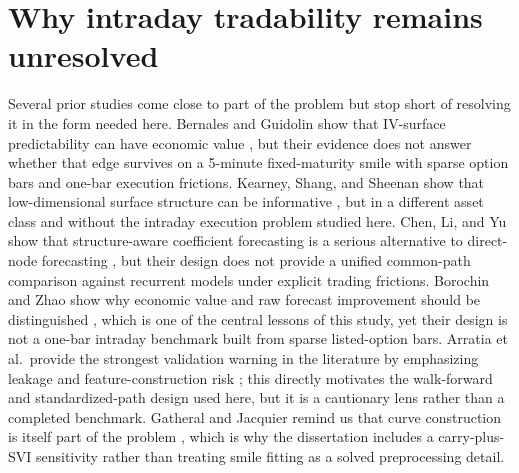 \documentclass[12pt]{report}
\begin{document}
\section{Why intraday tradability remains unresolved}
Several prior studies come close to part of the problem but stop short of resolving it in the form needed here. Bernales and Guidolin show that IV-surface predictability can have economic value \citep{bernales2014}, but their evidence does not answer whether that edge survives on a 5-minute fixed-maturity smile with sparse option bars and one-bar execution frictions. Kearney, Shang, and Sheenan show that low-dimensional surface structure can be informative \citep{kearney2019}, but in a different asset class and without the intraday execution problem studied here. Chen, Li, and Yu show that structure-aware coefficient forecasting is a serious alternative to direct-node forecasting \citep{chen2024bspline}, but their design does not provide a unified common-path comparison against recurrent models under explicit trading frictions. Borochin and Zhao show why economic value and raw forecast improvement should be distinguished \citep{borochin2025}, which is one of the central lessons of this study, yet their design is not a one-bar intraday benchmark built from sparse listed-option bars. Arratia et al.\ provide the strongest validation warning in the literature by emphasizing leakage and feature-construction risk \citep{arratia2025}; this directly motivates the walk-forward and standardized-path design used here, but it is a cautionary lens rather than a completed benchmark. Gatheral and Jacquier remind us that curve construction is itself part of the problem \citep{gatheral2014arbitrage}, which is why the dissertation includes a carry-plus-SVI sensitivity rather than treating smile fitting as a solved preprocessing detail.
\end{document}

